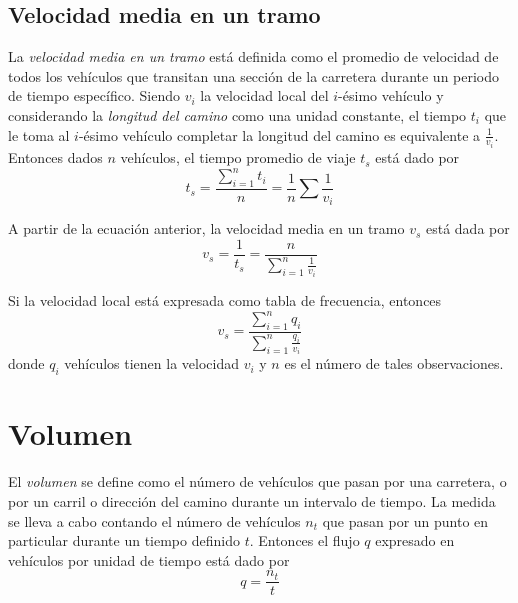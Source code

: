 \subsection{Velocidad media en un tramo}

La \emph{velocidad media en un tramo} está definida como el promedio de velocidad de todos los vehículos que transitan una sección de la carretera durante un periodo de tiempo específico. Siendo $v_{i}$ la velocidad local del $i$-ésimo vehículo y considerando la \emph{longitud del camino} como una unidad constante, el tiempo $t_{i}$ que le toma al $i$-ésimo vehículo completar la longitud del camino es equivalente a $\frac { 1 }{ { v }_{ i } }$. Entonces dados $n$ vehículos, el tiempo promedio de viaje $t_s$ está dado por
\begin{equation}
{ t }_{ s }=\frac { \sum _{ i=1 }^{ n }{ { t }_{ i } }  }{ n } =\frac { 1 }{ n } \sum { \frac { 1 }{ { v }_{ i } }  }
\end{equation}

A partir de la ecuación anterior, la velocidad media en un tramo ${ v }_{ s }$ está dada por
\begin{equation}
{ v }_{ s }=\frac { 1 }{ { t }_{ s } }=\frac { n }{ \sum _{ i=1 }^{ n }{ \frac { 1 }{ { v }_{ i } }  }  }
\end{equation}

Si la velocidad local está expresada como tabla de frecuencia, entonces
\begin{equation}
{ v }_{ s }=\frac { \sum _{ i=1 }^{ n }{ { q }_{ i } }  }{ \sum _{ i=1 }^{ n }{ \frac { { q }_{ i } }{ { v }_{ i } }  }  } 
\end{equation}
donde $q_{i}$ vehículos tienen la velocidad $v_{i}$ y $n$ es el número de tales observaciones.

\section{Volumen}

El \emph{volumen} se define como el número de vehículos que pasan por una carretera, o por un carril o dirección del camino durante un intervalo de tiempo. La medida se lleva a cabo contando el número de vehículos $n_{t}$ que pasan por un punto en particular durante un tiempo definido $t$. Entonces el flujo $q$ expresado en vehículos por unidad de tiempo está dado por
\begin{equation}
q=\frac { { n }_{ t } }{ t }
\end{equation}

